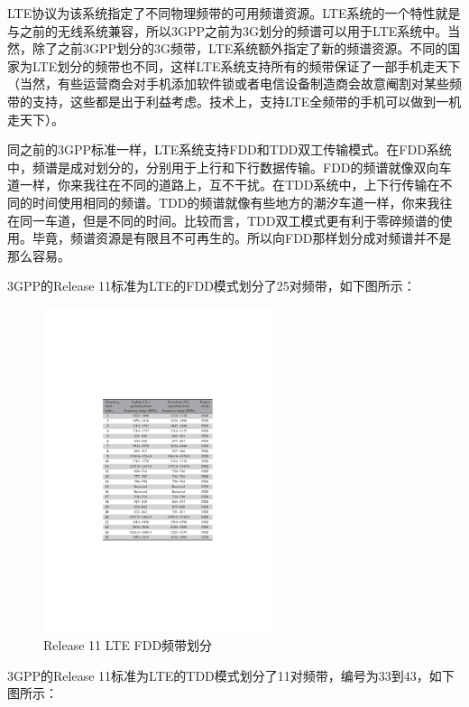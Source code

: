 \documentclass[10pt,a4paper,UTF8]{article}
\begin{document}
LTE协议为该系统指定了不同物理频带的可用频谱资源。LTE系统的一个特性就是与之前的无线系统兼容，所以3GPP之前为3G划分的频谱可以用于LTE系统中。当然，除了之前3GPP划分的3G频带，LTE系统额外指定了新的频谱资源。不同的国家为LTE划分的频带也不同，这样LTE系统支持所有的频带保证了一部手机走天下（当然，有些运营商会对手机添加软件锁或者电信设备制造商会故意阉割对某些频带的支持，这些都是出于利益考虑。技术上，支持LTE全频带的手机可以做到一机走天下）。

同之前的3GPP标准一样，LTE系统支持FDD和TDD双工传输模式。在FDD系统中，频谱是成对划分的，分别用于上行和下行数据传输。FDD的频谱就像双向车道一样，你来我往在不同的道路上，互不干扰。在TDD系统中，上下行传输在不同的时间使用相同的频谱。TDD的频谱就像有些地方的潮汐车道一样，你来我往在同一车道，但是不同的时间。比较而言，TDD双工模式更有利于零碎频谱的使用。毕竟，频谱资源是有限且不可再生的。所以向FDD那样划分成对频谱并不是那么容易。

3GPP的Release 11标准为LTE的FDD模式划分了25对频带，如下图所示：

\begin{figure}[htb]
\centering
\includegraphics[width=0.6\textwidth]{../../img/20150719lte-fdd.pdf}
\caption{Release 11 LTE FDD频带划分}
\end{figure}

3GPP的Release 11标准为LTE的TDD模式划分了11对频带，编号为33到43，如下图所示：
\end{document}
